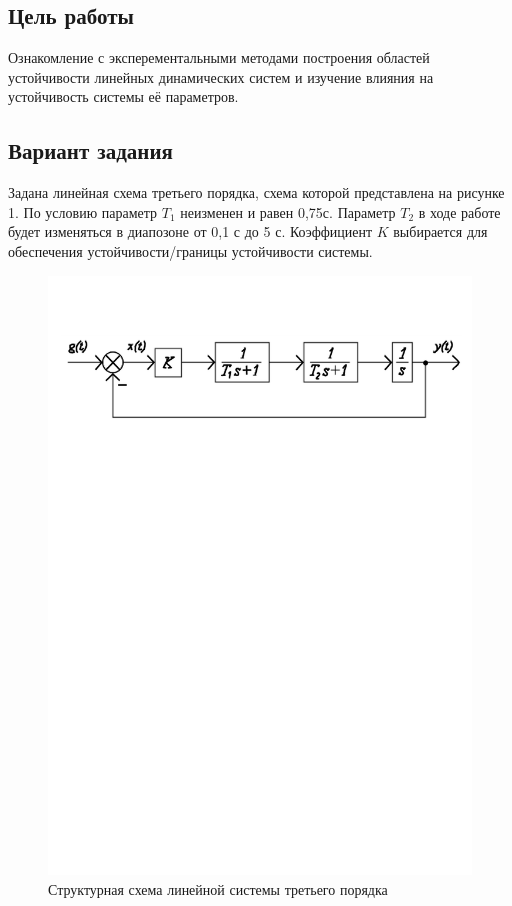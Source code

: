 \documentclass[a4paper, 11pt, russian]{article}
\begin{document}
    
    \subsection*{Цель работы}
    Ознакомление с эксперементальными методами построения областей устойчивости линейных динамических систем и изучение влияния на устойчивость системы её параметров.
    \subsection*{Вариант задания}
    Задана линейная схема третьего порядка, схема которой представлена на рисунке 1. По условию параметр $T_1$ неизменен и равен 0,75с. Параметр $T_2$ в ходе работе будет изменяться в диапозоне от 0,1 с до 5 с. Коэффициент $K$ выбирается для обеспечения устойчивости/границы устойчивости системы.
    \begin{figure}[h!]
        \centering
        \includegraphics[scale = 0.8]{structureScheme}
        \caption{Структурная схема линейной системы третьего порядка}
    \end{figure}
    \clearpage
\end{document}
